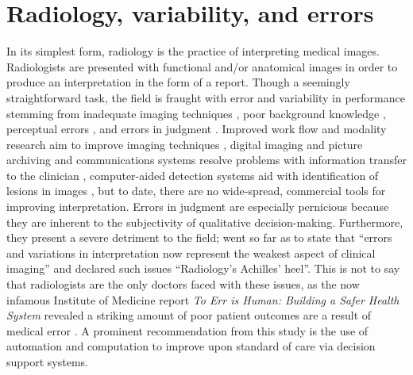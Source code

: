 \section{Radiology, variability, and errors}
In its simplest form, radiology is the practice of interpreting medical images. 
Radiologists are presented with functional and/or anatomical images in order to produce an interpretation in the form of a report. 
Though a seemingly straightforward task, the field is fraught with error and variability in performance \cite{Fitzgerald:2001hn} stemming from inadequate imaging techniques \cite{Berlin:1996ib}, poor background knowledge \cite{Berlin:1996ei}, perceptual errors \cite{Berlin:1_mkt9li}, and errors in judgment \cite{Berlin:1996vw}.
Improved work flow and modality research aim to improve imaging techniques \cite{Noumeir:2006cb}, digital imaging and picture archiving and communications systems resolve problems with information transfer to the clinician \cite{Strickland:2000cv,Bryan:1999kn}, computer-aided detection systems aid with identification of lesions in images \cite{Oliver:2010fm}, but to date, there are no wide-spread, commercial tools for improving interpretation.
Errors in judgment are especially pernicious because they are inherent to the subjectivity of qualitative decision-making.
Furthermore, they present a severe detriment to the field;  went so far as to state that ``errors and variations in interpretation now represent the weakest aspect of clinical imaging'' and declared such issues ``Radiology's Achilles' heel''. 
This is not to say that radiologists are the only doctors faced with these issues, as the now infamous Institute of Medicine report \emph{To Err is Human: Building a Safer Health System} revealed a striking amount of poor patient outcomes are a result of medical error \cite{Anonymous:2000va}.
A prominent recommendation from this study is the use of automation and computation to improve upon standard of care via decision support systems.

